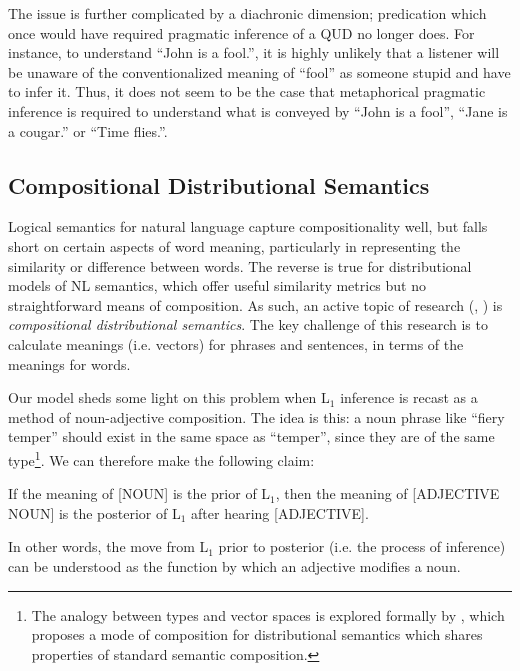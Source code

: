 \documentclass[10pt,letterpaper,twocolumn]{article}
\begin{document}

The issue is further complicated by a diachronic dimension; predication which once would have required pragmatic inference of a QUD no longer does. For instance, to understand ``John is a fool.'', it is highly unlikely that a listener will be unaware of the conventionalized meaning of ``fool'' as someone stupid and have to infer it. Thus, it does not seem to be the case that metaphorical pragmatic inference is required to understand what is conveyed by ``John is a fool'', ``Jane is a cougar.'' or ``Time flies.''.  

\subsection{Compositional Distributional Semantics}

Logical semantics for natural language capture compositionality well, but falls short on certain aspects of word meaning, particularly in representing the similarity or difference between words. The reverse is true for distributional models of NL semantics, which offer useful similarity metrics but no straightforward means of composition. As such, an active topic of research (\cite{socher2013recursive}, \cite{coecke2010mathematical}) is \emph{compositional distributional semantics}. The key challenge of this research is to calculate meanings (i.e. vectors) for phrases and sentences, in terms of the meanings for words.

Our model sheds some light on this problem when L$_1$ inference is recast as a method of noun-adjective composition. The idea is this: a noun phrase like ``fiery temper'' should exist in the same space as ``temper'', since they are of the same type\footnote{The analogy between types and vector spaces is explored formally by \cite{coecke2010mathematical}, which proposes a mode of composition for distributional semantics which shares properties of standard semantic composition.}. We can therefore make the following claim:
\begin{exe}
\ex If the meaning of [NOUN] is the prior of L$_1$, then the meaning of [ADJECTIVE NOUN] is the posterior of L$_1$ after hearing [ADJECTIVE]. \label{prop1}
\end{exe}

In other words, the move from L$_1$ prior to posterior (i.e. the process of inference) can be understood as the function by which an adjective modifies a noun.
\end{document}
